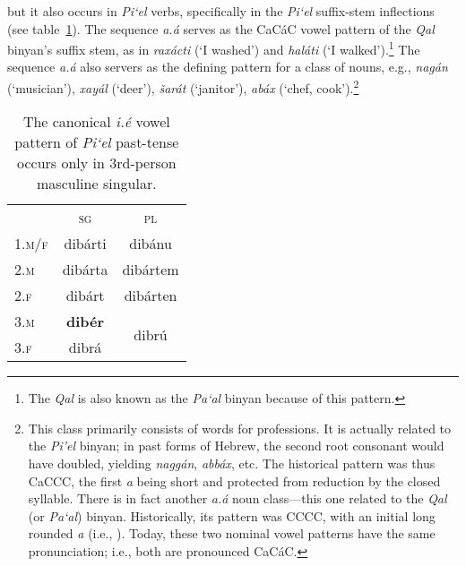  but it also occurs in \textit{Pi`{e}l} verbs, specifically in the \textit{Pi`{e}l} suffix-stem inflections (see table~\ref{tab:piel-paradigm}).
The sequence \textit{a.\'{a}} serves as the CaC\'{a}C vowel pattern of the \textit{Qal} 
binyan's suffix stem, as in \textit{rax\'{a}cti} (`I washed') and 
\textit{hal\'{a}ti} (`I walked').\footnote{The \textit{Qal} is also known as the \textit{\textit{Pa`al}} binyan because of this pattern.}
The sequence \textit{a.\'{a}} also servers as the defining pattern for a class of nouns, e.g., \textit{nag\'{a}n} (`musician'),  \textit{xay\'{a}l} (`deer'), \textit{\v{s}ar\'{a}t} (`janitor'), 
\textit{ab\'{a}x} (`chef, cook').\footnote{This class primarily consists of words for professions. It is actually related to the \textit{Pi'el} binyan; in past forms of Hebrew, the second root consonant would have doubled, yielding \textit{nagg\'{a}n}, \textit{abb\'{a}x}, etc. The historical pattern was thus CaCCC, the first \textit{a} being short and protected from reduction by the closed syllable.   There is in fact another \textit{a.\'{a}} noun class---this one related to the \textit{Qal} (or \textit{Pa`al}) binyan. Historically, its pattern was CCCC, with an initial long rounded \textit{a} (i.e., ). Today, these two nominal vowel patterns have the same pronunciation; i.e., both are pronounced CaC\'{a}C.}

\begin{table}[t]
\centering
\setlength{\extrarowheight}{6pt}
\begin{tabular}{lcc}
\toprule
& \textsc{sg} & \textsc{pl} \\
\cmidrule{2-3}
\textsc{1.m/f} & dib\'{a}rti &  dib\'{a}nu \\
\textsc{2.m} & dib\'{a}rta & dib\'{a}rtem \\
\textsc{2.f} & dib\'{a}rt & dib\'{a}rten \\
\textsc{3.m} & \textbf{dib\'{e}r} & \multirow{2}{*}{dibr\'{u}} \\
\textsc{3.f} &  dibr\'{a} &  \\
 \bottomrule
\end{tabular}
\label{tab:piel-paradigm}
\caption{The canonical \textit{i.\'e} vowel pattern of \textit{Pi`el} past-tense occurs only in 3rd-person masculine singular.}
\end{table}


